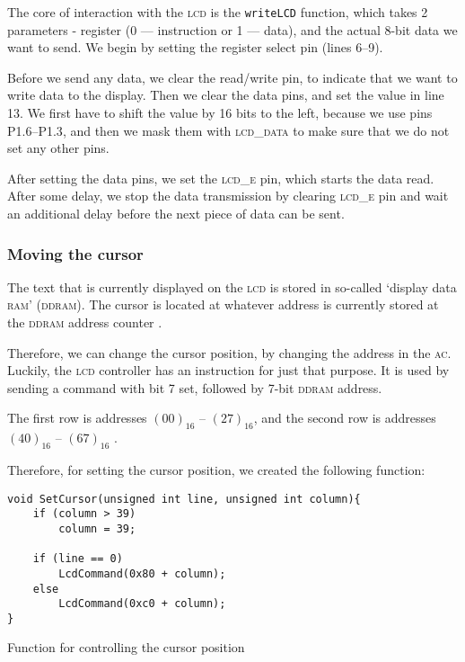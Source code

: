 \documentclass[10pt]{article}
\begin{document}
The core of interaction with the \textsc{lcd} is the \texttt{writeLCD} function, which takes 2 parameters - register (0 --- instruction or 1 --- data),
and the actual 8-bit data we want to send. 
We begin by setting the register select pin (lines 6--9).

Before we send any data, we clear the read/write pin, to indicate that we want to write data to the display.
Then we clear the data pins, and set the value in line 13.
We first have to shift the value by 16 bits to the left, because we use pins {\small P1.6}--{\small P1.3}, and then we mask them with \textsc{lcd\_data} to make sure that we do not set any other pins.

\pagebreak
After setting the data pins, we set the \textsc{lcd\_e} pin, which starts the data read. 
After some delay, we stop the data transmission by clearing \textsc{lcd\_e} pin and wait an additional delay before the next piece of data can be sent.

\subsubsection{Moving the cursor}
The text that is currently displayed on the \textsc{lcd} is stored in so-called `display data \textsc{ram}' (\textsc{ddram}). 
The cursor is located at whatever address is currently stored at the \textsc{ddram} address counter \cite[p.21]{display-man}.

Therefore, we can change the cursor position, by changing the address in the \textsc{ac}.
Luckily, the \textsc{lcd} controller has an instruction for just that purpose.
It is used by sending a command with bit 7 set, followed by 7-bit \textsc{ddram} address.

The first row is addresses $(00)_{16}$ -- $(27)_{16}$, and the second row is addresses $(40)_{16}$ -- $(67)_{16}$ \cite[p.11]{display-man}.

Therefore, for setting the cursor position, we created the following function:
\begin{program}[H]
	\begin{lstlisting}
void SetCursor(unsigned int line, unsigned int column){
    if (column > 39)
        column = 39;

    if (line == 0)
        LcdCommand(0x80 + column);
    else 
        LcdCommand(0xc0 + column);
}
	\end{lstlisting}
	\caption{Function for controlling the cursor position}
\end{program}
\end{document}
